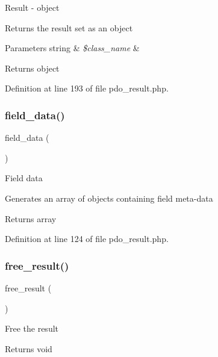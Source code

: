 Result -\/ object

Returns the result set as an object


\begin{DoxyParams}[1]{Parameters}
string & {\em \$class\+\_\+name} & \\
\hline
\end{DoxyParams}
\begin{DoxyReturn}{Returns}
object 
\end{DoxyReturn}


Definition at line 193 of file pdo\+\_\+result.\+php.

\mbox{\label{class_c_i___d_b__pdo__result_a84bffd65e53902ade1591716749a33e3}} 
\subsubsection{\texorpdfstring{field\_data()}{field\_data()}}
{\footnotesize\ttfamily field\+\_\+data (\begin{DoxyParamCaption}{ }\end{DoxyParamCaption})}

Field data

Generates an array of objects containing field meta-\/data

\begin{DoxyReturn}{Returns}
array 
\end{DoxyReturn}


Definition at line 124 of file pdo\+\_\+result.\+php.

\mbox{\label{class_c_i___d_b__pdo__result_aad2d98d6beb3d6095405356c6107b473}} 
\subsubsection{\texorpdfstring{free\_result()}{free\_result()}}
{\footnotesize\ttfamily free\+\_\+result (\begin{DoxyParamCaption}{ }\end{DoxyParamCaption})}

Free the result

\begin{DoxyReturn}{Returns}
void 
\end{DoxyReturn}


